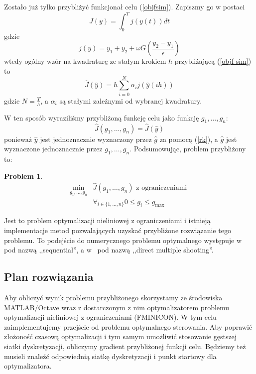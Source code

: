 \documentclass[11pt]{article}
\newtheorem{problem}{Problem}
\begin{document}
Zostało już tylko przybliżyć funkcjonał celu (\ref{objfsim}). Zapiszmy go w postaci
\begin{equation} \label{objf-sim}
  J(y) = \int_0^T j(y(t)) dt
\end{equation}
gdzie
\begin{equation}
  j(y) = y_1 + y_2 + \omega G\left(\frac{y_2 - y_1}{\epsilon} \right)
\end{equation}
wtedy ogólny wzór na kwadraturę ze stałym krokiem $h$ przybliżającą (\ref{objf-sim}) to
\begin{equation} \label{quad}
  \hat{J}(\hat{y}) = h\sum_{i = 0}^N \alpha_i j(\hat{y}(ih))
\end{equation}
gdzie $N = \frac{T}{h}$, a $\alpha_i$ są stałymi zależnymi od wybranej kwadratury.

W ten sposób wyraziliśmy przybliżoną funkcję celu jako funkcję $g_1,\ldots,g_n$:
\begin{equation}
  \hat{J}(g_1,\ldots, g_n) = \hat{J}(\hat{y})
\end{equation}
ponieważ $\hat{y}$ jest jednoznacznie wyznaczony przez $\hat{g}$ za pomocą (\ref{rk}), a $\hat{g}$ jest wyznaczone jednoznacznie przez $g_1,\ldots,g_n$. Podsumowując, problem przybliżony to:
\begin{problem}\label{problemapprox}
\begin{align}
  \min_{g_1,\ldots,g_n} &\hat{J}(g_1,\ldots, g_n) \text{ z ograniczeniami } \label{nlp}\\
  &\forall_{i \in \{1,\ldots,n\}} 0 \le g_i \le g_{\max} \label{nlp_cons}
\end{align}
\end{problem}

Jest to problem optymalizacji nieliniowej z ograniczeniami i istnieją implementacje metod pozwalających uzyskać przybliżone rozwiązanie tego problemu. To podejście do numerycznego problemu optymalnego występuje w~\cite{diehl} pod nazwą ,,sequential'', a w~\cite{rao-methods} pod nazwą ,,direct multiple shooting''.

\subsection{Plan rozwiązania}
Aby obliczyć wynik problemu przybliżonego skorzystamy ze środowiska MATLAB/Octave wraz z dostarczonym z nim optymalizatorem problemu optymalizacji nieliniowej z ograniczeniami (FMINICON). W tym celu zaimplementujemy przejście od problemu optymalnego sterowania. Aby poprawić złożoność czasową optymalizacji i tym samym umożliwić stosowanie gęstszej siatki dyskretyzacji, obliczymy gradient przybliżonej funkcji celu. Będziemy też musieli znaleźć odpowiednią siatkę dyskretyzacji i punkt startowy dla optymalizatora.
\end{document}
